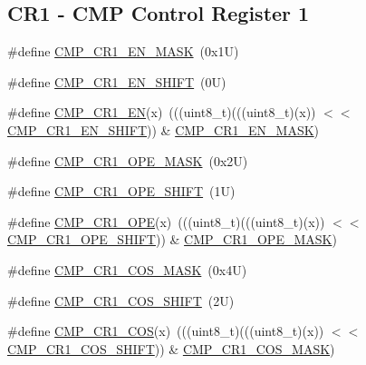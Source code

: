 \subsection*{C\+R1 -\/ C\+MP Control Register 1}
\begin{DoxyCompactItemize}
\item 
\#define \mbox{\hyperlink{group___c_m_p___register___masks_ga2492ad39a9661a1217cc26f20bd31ef2}{C\+M\+P\+\_\+\+C\+R1\+\_\+\+E\+N\+\_\+\+M\+A\+SK}}~(0x1\+U)
\item 
\#define \mbox{\hyperlink{group___c_m_p___register___masks_gacaacf0894bdf41eb49de1ae81075fa2b}{C\+M\+P\+\_\+\+C\+R1\+\_\+\+E\+N\+\_\+\+S\+H\+I\+FT}}~(0\+U)
\item 
\#define \mbox{\hyperlink{group___c_m_p___register___masks_ga1f0fd12e9a61eced3f9d44e58269539e}{C\+M\+P\+\_\+\+C\+R1\+\_\+\+EN}}(x)~(((uint8\+\_\+t)(((uint8\+\_\+t)(x)) $<$$<$ \mbox{\hyperlink{group___c_m_p___register___masks_gacaacf0894bdf41eb49de1ae81075fa2b}{C\+M\+P\+\_\+\+C\+R1\+\_\+\+E\+N\+\_\+\+S\+H\+I\+FT}})) \& \mbox{\hyperlink{group___c_m_p___register___masks_ga2492ad39a9661a1217cc26f20bd31ef2}{C\+M\+P\+\_\+\+C\+R1\+\_\+\+E\+N\+\_\+\+M\+A\+SK}})
\item 
\#define \mbox{\hyperlink{group___c_m_p___register___masks_gaaad42787753465406dd5006f228049dd}{C\+M\+P\+\_\+\+C\+R1\+\_\+\+O\+P\+E\+\_\+\+M\+A\+SK}}~(0x2\+U)
\item 
\#define \mbox{\hyperlink{group___c_m_p___register___masks_ga5c273c5f23e09e69a9589a285cbe2c24}{C\+M\+P\+\_\+\+C\+R1\+\_\+\+O\+P\+E\+\_\+\+S\+H\+I\+FT}}~(1\+U)
\item 
\#define \mbox{\hyperlink{group___c_m_p___register___masks_gac2c253d65771b16bf9124105672e5fbd}{C\+M\+P\+\_\+\+C\+R1\+\_\+\+O\+PE}}(x)~(((uint8\+\_\+t)(((uint8\+\_\+t)(x)) $<$$<$ \mbox{\hyperlink{group___c_m_p___register___masks_ga5c273c5f23e09e69a9589a285cbe2c24}{C\+M\+P\+\_\+\+C\+R1\+\_\+\+O\+P\+E\+\_\+\+S\+H\+I\+FT}})) \& \mbox{\hyperlink{group___c_m_p___register___masks_gaaad42787753465406dd5006f228049dd}{C\+M\+P\+\_\+\+C\+R1\+\_\+\+O\+P\+E\+\_\+\+M\+A\+SK}})
\item 
\#define \mbox{\hyperlink{group___c_m_p___register___masks_gaf8b38740c4bddec386b2b7d674f5f0fc}{C\+M\+P\+\_\+\+C\+R1\+\_\+\+C\+O\+S\+\_\+\+M\+A\+SK}}~(0x4\+U)
\item 
\#define \mbox{\hyperlink{group___c_m_p___register___masks_gaaf826df5b4ff2069e2cb112f03c7b782}{C\+M\+P\+\_\+\+C\+R1\+\_\+\+C\+O\+S\+\_\+\+S\+H\+I\+FT}}~(2\+U)
\item 
\#define \mbox{\hyperlink{group___c_m_p___register___masks_ga7b21f24c4a39952ce03371054c09fd6e}{C\+M\+P\+\_\+\+C\+R1\+\_\+\+C\+OS}}(x)~(((uint8\+\_\+t)(((uint8\+\_\+t)(x)) $<$$<$ \mbox{\hyperlink{group___c_m_p___register___masks_gaaf826df5b4ff2069e2cb112f03c7b782}{C\+M\+P\+\_\+\+C\+R1\+\_\+\+C\+O\+S\+\_\+\+S\+H\+I\+FT}})) \& \mbox{\hyperlink{group___c_m_p___register___masks_gaf8b38740c4bddec386b2b7d674f5f0fc}{C\+M\+P\+\_\+\+C\+R1\+\_\+\+C\+O\+S\+\_\+\+M\+A\+SK}})
$$
\end{DoxyCompactItemize}
